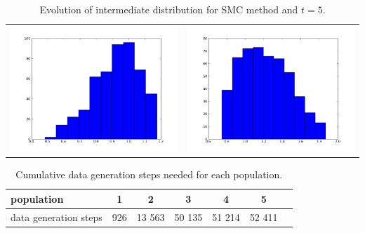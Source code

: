 \documentclass[12pt,a4paper,titlepage]{article}
\begin{document}
\begin{table}[ht]
\begin{tabular}{cc}
\includegraphics[scale=0.2]{p5th1_1}&\includegraphics[scale=0.2]{p5th2_1.png}\\
\end{tabular}
\caption{Evolution of intermediate distribution for SMC method and $t=5$.}
\label{tab:smcinter}
\end{table}
\begin{table}[ht]
\centering
\begin{tabular}{ l*{5} c r }
\hline
population              & 1 & 2 & 3 & 4 & 5 \\
\hline
data generation steps & 926 & 13 563 & 50 135 & 51 214 & 52 411   \\
\hline
\end{tabular}
\caption{Cumulative data generation steps needed for each population.}
\label{tab:dsteps}
\end{table}
\end{document}
